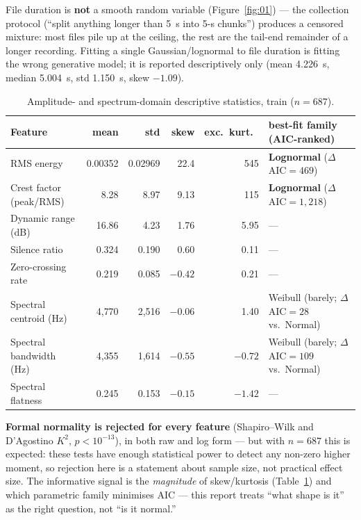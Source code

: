\documentclass[11pt]{article}
\begin{document}
File duration is \textbf{not} a smooth random variable (Figure~\ref{fig:01})
--- the collection protocol (``split anything longer than 5~s into 5-s
chunks'') produces a censored mixture: most files pile up at the ceiling, the
rest are the tail-end remainder of a longer recording. Fitting a single
Gaussian/lognormal to file duration is fitting the wrong generative model; it
is reported descriptively only (mean 4.226~s, median 5.004~s, std 1.150~s,
skew $-1.09$).

\begin{table}[h]
\centering
\caption{Amplitude- and spectrum-domain descriptive statistics, train ($n=687$).}
\label{tab:waveform-stats}
\small
\begin{tabular}{l r r r r l}
\toprule
Feature & mean & std & skew & exc.\ kurt.\ & best-fit family (AIC-ranked) \\
\midrule
RMS energy               & 0.00352 & 0.02969 & 22.4 & 545 & \textbf{Lognormal} ($\Delta$AIC$=469$) \\
Crest factor (peak/RMS)  & 8.28    & 8.97    & 9.13 & 115 & \textbf{Lognormal} ($\Delta$AIC$=1{,}218$) \\
Dynamic range (dB)       & 16.86   & 4.23    & 1.76 & 5.95 & --- \\
Silence ratio            & 0.324   & 0.190   & 0.60 & 0.11 & --- \\
Zero-crossing rate       & 0.219   & 0.085   & $-0.42$ & 0.21 & --- \\
Spectral centroid (Hz)   & 4{,}770 & 2{,}516 & $-0.06$ & 1.40 & Weibull (barely; $\Delta$AIC$=28$ vs.\ Normal) \\
Spectral bandwidth (Hz)  & 4{,}355 & 1{,}614 & $-0.55$ & $-0.72$ & Weibull (barely; $\Delta$AIC$=109$ vs.\ Normal) \\
Spectral flatness        & 0.245   & 0.153   & $-0.15$ & $-1.42$ & --- \\
\bottomrule
\end{tabular}
\end{table}

\textbf{Formal normality is rejected for every feature} (Shapiro--Wilk and
D'Agostino $K^2$, $p<10^{-13}$), in both raw and log form --- but with
$n=687$ this is expected: these tests have enough statistical power to
detect any non-zero higher moment, so rejection here is a statement about
sample size, not practical effect size. The informative signal is the
\emph{magnitude} of skew/kurtosis (Table~\ref{tab:waveform-stats}) and which
parametric family minimises AIC --- this report treats ``what shape is it''
as the right question, not ``is it normal.''
\end{document}

